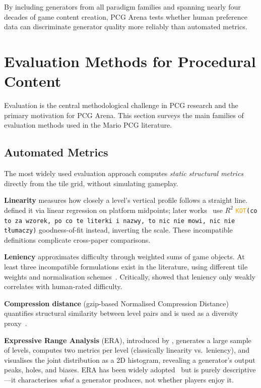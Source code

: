\documentclass[shortabstract, mgr, english]{iithesis}
\newcommand{\DEBUG}[1]{{#1}} %
\newcommand{\KOT}[1]{\DEBUG{\tt{\textcolor{orange}{KOT}(}{#1}{)}}}
\begin{document}
By including generators from all paradigm families and spanning nearly four
decades of game content creation, PCG Arena tests whether human preference data
can discriminate generator quality more reliably than automated metrics.


\section{Evaluation Methods for Procedural Content}
\label{sec:bg-evaluation}

Evaluation is the central methodological challenge in PCG research and the
primary motivation for PCG Arena. This section surveys the main families of
evaluation methods used in the Mario PCG literature.

\subsection{Automated Metrics}
\label{subsec:bg-eval-automated}

The most widely used evaluation approach computes \emph{static structural
metrics} directly from the tile grid, without simulating gameplay.

\textbf{Linearity} measures how closely a level's vertical profile follows a
straight line. \citet{smith2010analyzing} defined it via linear regression on
platform midpoints; later works~\citep{horn2014comparative,
summerville2017understanding} use $R^2$ \KOT{co to za wzorek, po co te literki i nazwy, to nic nie mowi, nic nie tłumaczy} goodness-of-fit instead, inverting the
scale. These incompatible definitions complicate cross-paper comparisons.

\textbf{Leniency} approximates difficulty through weighted sums of game objects.
At least three incompatible formulations exist in the literature, using different
tile weights and normalisation schemes~\citep{smith2010analyzing,
shaker2012evolving, marino2015empirical}. Critically,
\citet{marino2015empirical} showed that leniency only weakly correlates with
human-rated difficulty.

\textbf{Compression distance} (gzip-based Normalised Compression Distance)
quantifies structural similarity between level pairs and is used as a diversity
proxy~\citep{shaker2012evolving, horn2014comparative}.

\textbf{Expressive Range Analysis} (ERA), introduced by
\citet{smith2010analyzing}, generates a large sample of levels, computes two
metrics per level (classically linearity vs.\ leniency), and visualises the joint
distribution as a 2D histogram, revealing a generator's output peaks, holes, and
biases. ERA has been widely adopted~\citep{horn2014comparative,
shaker2012evolving} but is purely descriptive---it characterises \emph{what} a
generator produces, not whether players enjoy it.
\end{document}
